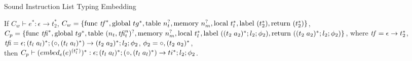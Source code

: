 \begin{lemma}{Sound Instruction List Typing Embedding}

    If $C_w \vdash e^{*} : \epsilon \rightarrow t_2^{*}$,
    $C_w = \{ \text{func } \tf^{*}, \text{global } tg^{*}, \text{table } n_t^{?}, \text{memory } n_m^{?}, \text{local } t_l^{*}, \text{label } (t_2^{*}), \text{return } (t_2^{*}) \}$,
    $C_p = \{ \text{func } \tfi^{*}, \text{global } tg^{*}, \text{table } (n_t,\tfi_t^n)^{?}, \text{memory } n_m^{?}, \text{local } t_l^{*}, \text{label } (\ti{t_2}{a_2}^{*};l_2;\phi_2), \text{return } (\ti{t_2}{a_2}^{*};l_2;\phi_2) \}$, where
    $\tf = \epsilon \rightarrow t_2^{*}$,
    $\tfi = \epsilon;\ti{t_l}{a_l}^{*};(\circ,\ti{t_l}{a_l}^{*}) \rightarrow \ti{t_2}{a_2}^{*};l_2;\phi_2$,
    $\phi_2 = \circ,\ti{t_2}{a_2}^{*}$,
    \\ then $C_p \vdash (\embed[e]{e}^{(t_l^{*})})^{*} : \epsilon;\ti{t_l}{a_l}^{*};(\circ,\ti{t_l}{a_l}^{*}) \rightarrow ti^{*};l_2;\phi_2$.


\end{lemma}
